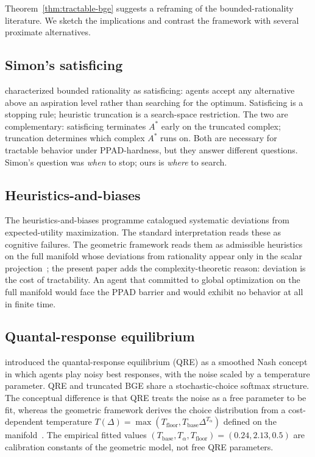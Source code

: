 \documentclass[11pt]{article}
\theoremstyle{definition}
\theoremstyle{remark}
\begin{document}
Theorem~\ref{thm:tractable-bge} suggests a reframing of the bounded-rationality literature. We sketch
the implications and contrast the framework with several proximate alternatives.

\subsection{Simon's satisficing}

\cite{simon1955} characterized bounded rationality as satisficing: agents accept any alternative
above an aspiration level rather than searching for the optimum. Satisficing is a stopping rule;
heuristic truncation is a search-space restriction. The two are complementary: satisficing terminates
$A^*$ early on the truncated complex; truncation determines which complex $A^*$ runs on. Both are
necessary for tractable behavior under PPAD-hardness, but they answer different questions. Simon's
question was \emph{when} to stop; ours is \emph{where} to search.

\subsection{Heuristics-and-biases}

The heuristics-and-biases programme \cite{tversky1974,kahneman1979} catalogued systematic deviations
from expected-utility maximization. The standard interpretation reads these as cognitive failures.
The geometric framework reads them as admissible heuristics on the full manifold whose deviations
from rationality appear only in the scalar projection~\cite[Theorem~10]{bond2026geometric}; the
present paper adds the complexity-theoretic reason: deviation is the cost of tractability. An agent
that committed to global optimization on the full manifold would face the PPAD barrier and would
exhibit no behavior at all in finite time.

\subsection{Quantal-response equilibrium}

\cite{mckelvey1995} introduced the quantal-response equilibrium (QRE) as a smoothed Nash concept in
which agents play noisy best responses, with the noise scaled by a temperature parameter. QRE and
truncated BGE share a stochastic-choice softmax structure. The conceptual difference is that QRE
treats the noise as a free parameter to be fit, whereas the geometric framework derives the choice
distribution from a cost-dependent temperature
$T(\Delta) = \max(T_{\text{floor}}, T_{\text{base}} \Delta^{T_\alpha})$ defined on the
manifold~\cite{bond2026tcss}. The empirical fitted values
$(T_{\text{base}}, T_\alpha, T_{\text{floor}}) = (0.24, 2.13, 0.5)$ are calibration constants of the
geometric model, not free QRE parameters.
\end{document}
